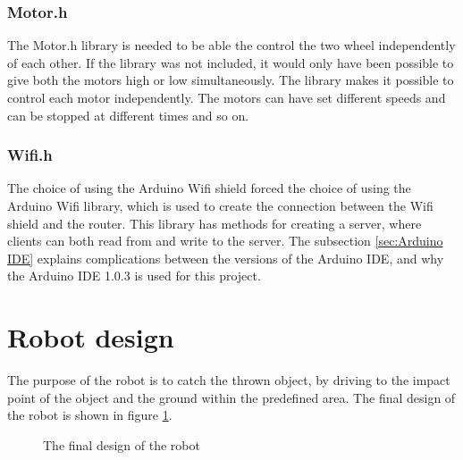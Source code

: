 \subsubsection{Motor.h}
\label{sec:Motor.h}
The Motor.h library is needed to be able the control the two wheel independently of each other. If the library was not included, it would only have been possible to give both the motors high or low simultaneously. The library makes it possible to control each motor independently. The motors can have set different speeds and can be stopped at different times and so on. 

\subsubsection{Wifi.h}
\label{sec:Wifi.h}
The choice of using the Arduino Wifi shield forced the choice of using the Arduino Wifi library, which is used to create the connection between the Wifi shield and the router. This library has methods for creating a server, where clients can both read from and write to the server. The subsection \ref{sec:Arduino IDE} explains complications between the versions of the Arduino IDE, and why the Arduino IDE 1.0.3 is used for this project.


\section{Robot design}
\label{sec:Robot design}
The purpose of the robot is to catch the thrown object, by driving to the impact point of the object and the ground within the predefined area. The final design of the robot is shown in figure \ref{robot}.

\begin{figure}[h]
	\centering
	\caption{The final design of the robot}
	\label{robot}
\end{figure}

